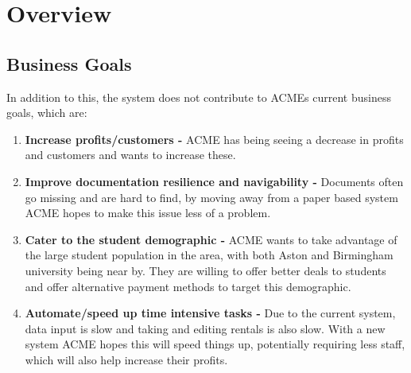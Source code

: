 \section{Overview}
  \subsection{Business Goals}

  In addition to this, the system does not contribute to ACMEs current business goals, which are:
  \begin{enumerate}
    \item \textbf{Increase profits/customers -} ACME has being seeing a decrease in profits and customers and wants to increase these.
    \item \textbf{Improve documentation resilience and navigability -} Documents often go missing and are hard to find, by moving away from a paper based
    system ACME hopes to make this issue less of a problem.
    \item \textbf{Cater to the student demographic -} ACME wants to take advantage of the large student population in the area, with both Aston and Birmingham
    university being near by. They are willing to offer better deals to students and offer alternative payment methods to target this demographic.
    \item \textbf{Automate/speed up time intensive tasks -} Due to the current system, data input is slow and taking and editing rentals is also slow. With a 
    new system ACME hopes this will speed things up, potentially requiring less staff, which will also help increase their profits.
  \end{enumerate}

